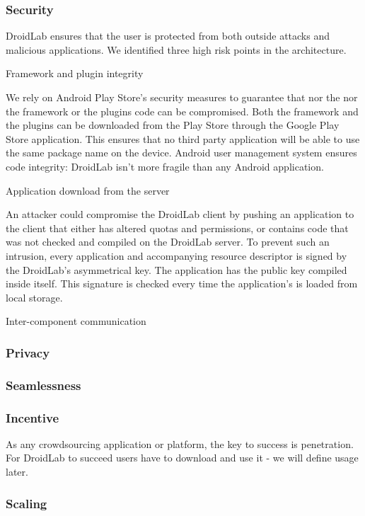 \documentclass[conference,letterpaper]{IEEEtran}
\begin{document}
\subsubsection{Security}
DroidLab ensures that the user is protected from both outside attacks and malicious applications. We identified three high risk points in the architecture.

Framework and plugin integrity

We rely on Android Play Store's security measures to guarantee that nor the nor the framework or the plugins code can be compromised. Both the framework and the plugins can be downloaded from the Play Store through the Google Play Store application. This ensures that no third party application will be able to use the same package name on the device. Android user management system ensures code integrity: DroidLab isn't more fragile than any Android application.

Application download from the server

An attacker could compromise the DroidLab client by pushing an application to the client that either has altered quotas and permissions, or contains code that was not checked and compiled on the DroidLab server. To prevent such an intrusion, every application and accompanying resource descriptor is signed by the DroidLab's asymmetrical key. The application has the public key compiled inside itself. This signature is checked every time the application's is loaded from local storage.

Inter-component communication



\subsubsection{Privacy}
\subsubsection{Seamlessness}
\subsubsection{Incentive}
As any crowdsourcing application or platform, the key to success is penetration. For DroidLab to succeed users have to download and use it - we will define usage later. 
\subsubsection{Scaling}
\label{sec:solutions}
\end{document}
